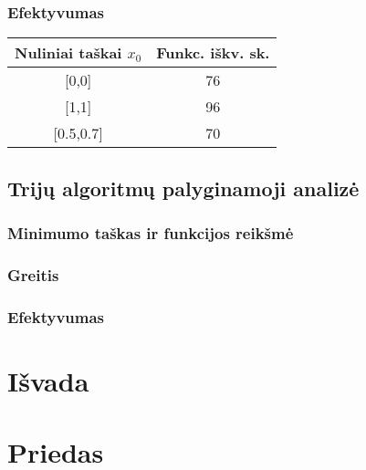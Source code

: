 \documentclass{article}
\begin{document}
\subsubsection{Efektyvumas}
\begin{table}[H]
    \centering
    \begin{tabular}{|c|c|} 
    \hline
    Nuliniai taškai $x_{0}$ & Funkc. iškv. sk.  \\ 
    \hline
    {[}0,0]            & 76                \\ 
    \hline
    {[}1,1]            & 96                \\ 
    \hline
    {[}0.5,0.7]        & 70                \\
    \hline
    \end{tabular}
\end{table}
\subsection{Trijų algoritmų palyginamoji analizė}
\subsubsection{Minimumo taškas ir funkcijos reikšmė}
\subsubsection{Greitis}
\subsubsection{Efektyvumas}
\section{Išvada}
\section{Priedas}
\end{document}
